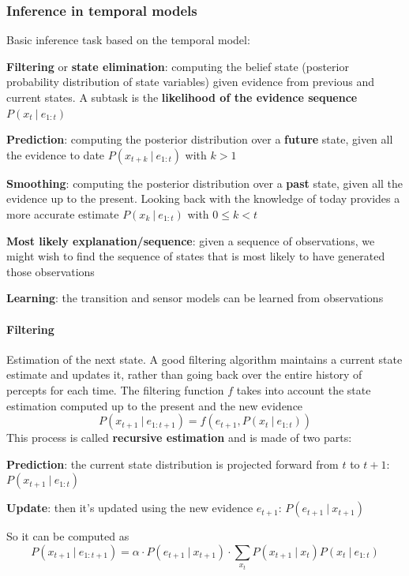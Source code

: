 \documentclass[10pt]{report}
\begin{document}
\subsubsection{Inference in temporal models}
Basic inference task based on the temporal model:
\begin{list}{}{}
	\item \textbf{Filtering} or \textbf{state elimination}: computing the belief state (posterior probability distribution of state variables) given evidence from previous and current states. A subtask is the \textbf{likelihood of the evidence sequence $P(x_t\:|\:e_{1:t})$}
	\item \textbf{Prediction}: computing the posterior distribution over a \textbf{future} state, given all the evidence to date $P(x_{t+k}\:|\:e_{1:t})$ with $k>1$
	\item \textbf{Smoothing}: computing the posterior distribution over a \textbf{past} state, given all the evidence up to the present. Looking back with the knowledge of today provides a more accurate estimate $P(x_k\:|\:e_{1:t})$ with $0\leq k < t$
	\item \textbf{Most likely explanation/sequence}: given a sequence of observations, we might wish to find the sequence of states that is most likely to have generated those observations
	\item \textbf{Learning}: the transition and sensor models can be learned from observations
\end{list}
\paragraph{Filtering} Estimation of the next state. A good filtering algorithm maintains a current state estimate and updates it, rather than going back over the entire history of percepts for each time. The filtering function $f$ takes into account the state estimation computed up to the present and the new evidence $$P(x_{t+1}\:|\:e_{1:t+1}) = f(e_{t+1},P(x_t\:|\:e_{1:t}))$$
This process is called \textbf{recursive estimation} and is made of two parts:
\begin{list}{}{}
	\item \textbf{Prediction}: the current state distribution is projected forward from $t$ to $t+1$: $P(x_{t+1}\:|\:e_{1:t})$
	\item \textbf{Update}: then it's updated using the new evidence $e_{t+1}$: $P(e_{t+1}\:|\:x_{t+1})$
\end{list}
So it can be computed as $$P(x_{t+1}\:|\:e_{1:t+1}) = \alpha\cdot P(e_{t+1}\:|\:x_{t+1})\cdot\sum_{x_t} P(x_{t+1}\:|\:x_t)P(x_t\:|\:e_{1:t})$$
\end{document}
